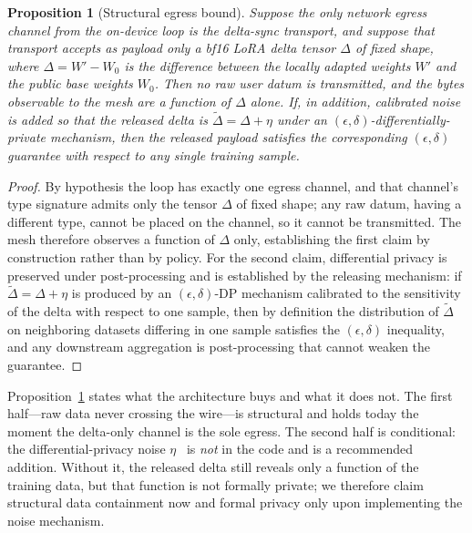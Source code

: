 \documentclass[11pt]{article}
\newtheorem{proposition}{Proposition}
\begin{document}
\begin{proposition}[Structural egress bound]
\label{prop:egress}
Suppose the only network egress channel from the on-device loop is the delta-sync transport, and suppose that transport accepts as payload only a bf16 LoRA delta tensor $\Delta$ of fixed shape, where $\Delta = W' - W_0$ is the difference between the locally adapted weights $W'$ and the public base weights $W_0$. Then no raw user datum is transmitted, and the bytes observable to the mesh are a function of $\Delta$ alone. If, in addition, calibrated noise is added so that the released delta is $\tilde{\Delta} = \Delta + \eta$ under an $(\epsilon,\delta)$-differentially-private mechanism, then the released payload satisfies the corresponding $(\epsilon,\delta)$ guarantee with respect to any single training sample.
\end{proposition}

\begin{proof}
By hypothesis the loop has exactly one egress channel, and that channel's type signature admits only the tensor $\Delta$ of fixed shape; any raw datum, having a different type, cannot be placed on the channel, so it cannot be transmitted. The mesh therefore observes a function of $\Delta$ only, establishing the first claim by construction rather than by policy. For the second claim, differential privacy is preserved under post-processing and is established by the releasing mechanism: if $\tilde{\Delta} = \Delta + \eta$ is produced by an $(\epsilon,\delta)$-DP mechanism calibrated to the sensitivity of the delta with respect to one sample, then by definition the distribution of $\tilde{\Delta}$ on neighboring datasets differing in one sample satisfies the $(\epsilon,\delta)$ inequality, and any downstream aggregation is post-processing that cannot weaken the guarantee.
\end{proof}

Proposition~\ref{prop:egress} states what the architecture buys and what it does not. The first half---raw data never crossing the wire---is structural and holds today the moment the delta-only channel is the sole egress. The second half is conditional: the differential-privacy noise $\eta$~\cite{dwork2014} is \emph{not} in the code and is a recommended addition. Without it, the released delta still reveals only a function of the training data, but that function is not formally private; we therefore claim structural data containment now and formal privacy only upon implementing the noise mechanism.
\end{document}
